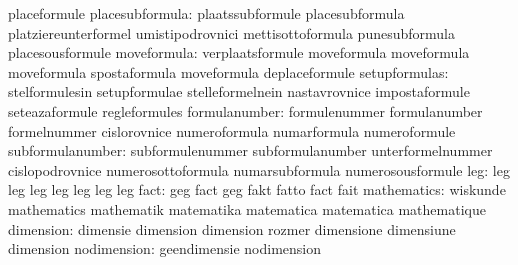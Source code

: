                                   placeformule
                 placesubformula: plaatssubformule                 placesubformula
                                  platziereunterformel             umistipodrovnici
                                  mettisottoformula                punesubformula
                                  placesousformule
                     moveformula: verplaatsformule                 moveformula
                                  moveformula                      moveformula
                                  spostaformula                    moveformula
                                  deplaceformule
                   setupformulas: stelformulesin                   setupformulae
                                  stelleformelnein                 nastavrovnice
                                  impostaformule                   seteazaformule
                                  regleformules
                   formulanumber: formulenummer                    formulanumber
                                  formelnummer                     cislorovnice
                                  numeroformula                    numarformula
                                  numeroformule
                subformulanumber: subformulenummer                 subformulanumber
                                  unterformelnummer                cislopodrovnice
                                  numerosottoformula               numarsubformula
                                  numerosousformule
                             leg: leg                              leg
                                  leg                              leg
                                  leg                              leg
                                  leg
                            fact: geg                              fact
                                  geg                              fakt
                                  fatto                            fact
                                  fait
                     mathematics: wiskunde                         mathematics
                                  mathematik                       matematika
                                  matematica                       matematica
                                  mathematique
                       dimension: dimensie                         dimension
                                  dimension                        rozmer
                                  dimensione                       dimensiune
                                  dimension
                     nodimension: geendimensie                     nodimension
